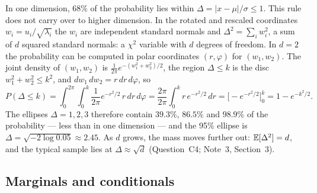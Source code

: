 \documentclass[11pt]{article}
\begin{document}
In one dimension, $68\%$ of the probability lies within $\Delta = \lvert x - \mu\rvert/\sigma \le 1$. This rule does
not carry over to higher dimension. In the rotated and rescaled coordinates $w_i = u_i/\sqrt{\lambda_i}$ the $w_i$
are independent standard normals and $\Delta^2 = \sum_i w_i^2$, a sum of $d$ squared standard normals: a
$\chi^2$ variable with $d$ degrees of freedom. In $d = 2$ the probability can be computed in polar coordinates
$(r, \varphi)$ for $(w_1, w_2)$. The joint density of $(w_1, w_2)$ is $\frac{1}{2\pi}e^{-(w_1^2 + w_2^2)/2}$, the
region $\Delta \le k$ is the disc $w_1^2 + w_2^2 \le k^2$, and $dw_1\,dw_2 = r\,dr\,d\varphi$, so
\[
  P(\Delta \le k) = \int_0^{2\pi}\!\!\int_0^k \frac{1}{2\pi} e^{-r^2/2}\, r\, dr\, d\varphi
  = \frac{2\pi}{2\pi}\int_0^k r\,e^{-r^2/2}\,dr
  = \Big[-e^{-r^2/2}\Big]_0^k = 1 - e^{-k^2/2} .
\]
The ellipses $\Delta = 1, 2, 3$ therefore contain $39.3\%$, $86.5\%$ and $98.9\%$ of the probability --- less than
in one dimension --- and the 95\% ellipse is $\Delta = \sqrt{-2\log 0.05} \approx 2.45$. As $d$ grows, the mass moves
further out: $\mathbb{E}[\Delta^2] = d$, and the typical sample lies at $\Delta \approx \sqrt d$ (Question~C4; Note~3,
Section~3).

\subsection{Marginals and conditionals}\label{sec:conditioning}
\end{document}
